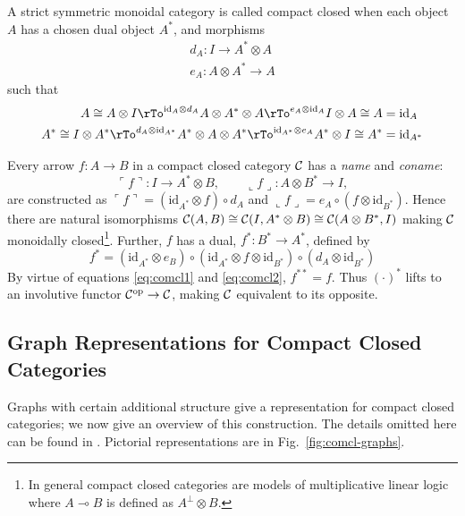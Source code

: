 \documentclass[runningheads]{llncs}
\newcommand{\iso}{\cong}
\newcommand{\name}[1]{%
\ulcorner #1 \urcorner}
\newcommand{\coname}[1]{%
\llcorner #1 \lrcorner}
\newcommand{\catC}{\ensuremath{{\cal C}}\xspace}
\newcommand{\id}[1]{\ensuremath{\mathrm{id}_{#1}}}
\begin{document}
\begin{definition}
\label{compactcat-def}
A strict symmetric monoidal  category
\cite{MacLane:CatsWM:1971,AspLon:CatTypStruct:1991} is called compact 
closed \cite{KelLap:comcl:1980} when each object $A$ has a chosen dual
object $A^*$, and morphisms
\begin{gather*}
  d_A : I \to A^* \otimes A\\
  e_A : A \otimes A^* \to A
\end{gather*}
such that
\begin{align}
  A \iso A \otimes I \rTo^{\id{A} \otimes d_A} A \otimes A^* \otimes A
  \rTo^{e_A \otimes \id{A}} I \otimes A \iso A & = \id{A} \label{eq:comcl1}\\
  A^* \iso I \otimes A^* \rTo^{ d_A \otimes \id{A^*}} A^* \otimes A
  \otimes A^* \rTo^{\id{A^*} \otimes e_A} A^* \otimes I \iso A^* & =
  \id{A^*} \label{eq:comcl2}
\end{align}
\end{definition}

Every arrow $f:A\to B$ in a compact closed category \catC
has a \emph{name} and \emph{coname}:
\[
\name{f} : I \to A^* \otimes B, \qquad \coname{f} : A \otimes  B^* \to I,
\]
are constructed as $\name{f} = (\id{A^*}\otimes f) \circ d_A$ and
$\coname{f} = e_A \circ (f \otimes \id{B^*})$.  Hence there are natural
isomorphisms $\catC(A,B) \iso \catC(I,A^*\otimes B) \iso
\catC(A\otimes B^*,I)$ making \catC monoidally closed\footnote{In
  general compact closed categories  are models of multiplicative
  linear logic where $A \multimap B$ is defined as $A^\bot \otimes B$.}.
Further,  $f$ has a dual, $f^* : B^* \to A^*$, defined by 
\[
f^* = (\id{A^*} \otimes e_B) \circ (\id{A^*}\otimes f \otimes
\id{B^*}) \circ (d_A \otimes \id{B^*})
\]
By virtue of equations \eqref{eq:comcl1} and \eqref{eq:comcl2}, $f^{**} =
f$.  Thus $(\cdot)^*$ lifts to an involutive functor
$\catC^{\text{op}} \to \catC$,  making $\catC$ equivalent to its
opposite.

\subsection{Graph Representations for Compact Closed Categories}
\label{sec:graph-repr-comp}

Graphs with certain additional structure give a
representation for compact closed  categories; we now give an overview
of this construction.  The details omitted here can be found in
\cite{Duncan:thesis:2006}.   Pictorial representations are in
Fig.~\ref{fig:comcl-graphs}.
\end{document}

